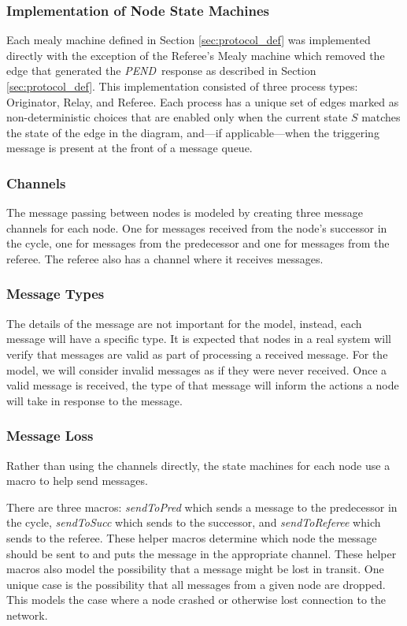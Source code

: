 \documentclass[runningheads]{llncs}
\newcommand{\pend}{\emph{PEND}}
\newcommand{\secref}[1]{Section \ref{#1}}
\newcommand{\spin}{Spin}
\newif\ifcomments
\newif\ifkylecomments
\newcommand{\egm}[1]{\ifcomments\textcolor{orange}{egm: #1}\fi}
\newcommand{\krs}[1]{\ifkylecomments\textcolor{blue}{krs: #1}\fi}
\begin{document}
\subsubsection{Implementation of Node State Machines} 
Each mealy machine defined in \secref{sec:protocol_def} was implemented directly with the exception of the Referee's Mealy machine which removed the edge that generated the \pend\ response as described in \secref{sec:protocol_def}. This implementation consisted of three process types: Originator, Relay, and Referee. Each process has a unique set of edges marked as non-deterministic choices that are enabled only when the current state $S$ matches the state of the edge in the diagram, and---if applicable---when the triggering message is present at the front of a message queue.


\subsubsection{Channels}
The message passing between nodes is modeled by creating three message channels for each node. One for messages received from the node's successor in the cycle, one for messages from the predecessor and one for messages from the referee. The referee also has a channel where it receives messages.

\subsubsection{Message Types}
The details of the message are not important for the model, instead, each message will have a specific type. It is expected that nodes in a real system will verify that messages are valid as part of processing a received message. For the model, we will consider invalid messages as if they were never received. Once a valid message is received, the type of that message will inform the actions a node will take in response to the message.

\subsubsection{Message Loss}
Rather than using the channels directly, the state machines for each node use a macro to help send messages. 
\krs{Good catch. Fixed. \egm{In the following sentence, \spin\ does not have functions. It only has macros. Change the text to match.}}
There are three macros: \emph{sendToPred} which sends a message to the predecessor in the cycle, \emph{sendToSucc} which sends to the successor, and \emph{sendToReferee} which sends to the referee. These helper macros determine which node the message should be sent to and puts the message in the appropriate channel. These helper macros also model the possibility that a message might be lost in transit.  One unique case is the possibility that all messages from a given node are dropped. This models the case where a node crashed or otherwise lost connection to the network. 
\end{document}
